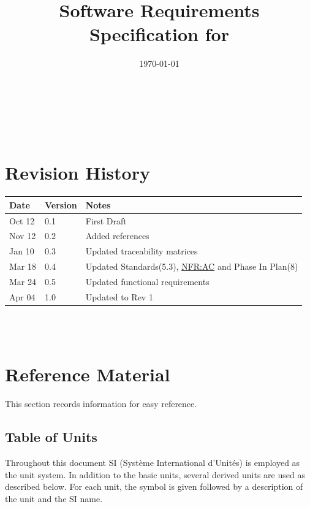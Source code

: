 \documentclass[12pt]{article}
\newcommand{\hpref}[1]{\hyperref[#1]{#1}}
\begin{document}
\title{Software Requirements Specification for \progname} 
\author{\authname}
\date{\today}
	
\maketitle

~\newpage


\tableofcontents

~\newpage

\section*{Revision History}

\begin{tabularx}{\textwidth}{p{3cm}p{2cm}X}
\toprule {\bf Date} & {\bf Version} & {\bf Notes}\\
\midrule
Oct 12 & 0.1 & First Draft\\
Nov 12 & 0.2 & Added references \\
Jan 10 & 0.3 & Updated traceability matrices \\
Mar 18 & 0.4 & Updated Standards(5.3), \hpref{NFR:AC} and Phase In Plan(8) \\
Mar 24 & 0.5 & Updated functional requirements \\
Apr 04 & 1.0 & Updated to Rev 1 \\
\bottomrule
\end{tabularx}

~\\

~\newpage

\section{Reference Material}

This section records information for easy reference.

\subsection{Table of Units}

Throughout this document SI (Syst\`{e}me International d'Unit\'{e}s) is employed
as the unit system.  In addition to the basic units, several derived units are
used as described below.  For each unit, the symbol is given followed by a
description of the unit and the SI name.
~\newline
\end{document}
